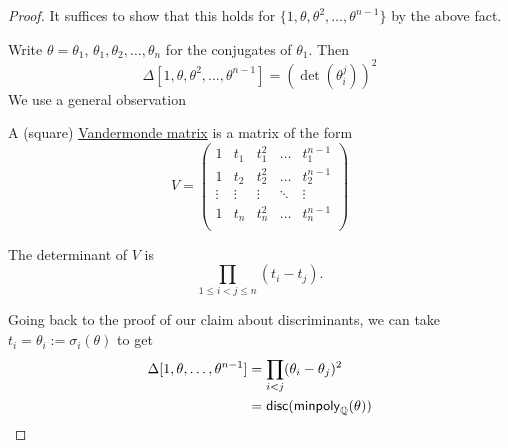 \begin{proof}
    It suffices to show that this holds for $\{1, \theta, \theta^2, \dots, \theta^{n-1}\}$ by the above fact.

    Write $\theta = \theta_1$, $\theta_1, \theta_2, \dots, \theta_n$ for the conjugates of $\theta_1$. Then
    \[\Delta[1, \theta, \theta^2, \dots, \theta^{n-1}] = \left(\det(\theta_i^j)\right)^2\]
    We use a general observation
    \begin{definition}
        A (square) \ul{Vandermonde matrix} is a matrix of the form
        \[V = \begin{pmatrix}
                1      & t_1    & t_1^2  & \dots  & t_1^{n-1} \\
                1      & t_2    & t_2^2  & \dots  & t_2^{n-1} \\
                \vdots & \vdots & \vdots & \ddots & \vdots    \\
                1      & t_n    & t_n^2  & \dots  & t_n^{n-1} \\
            \end{pmatrix}\]
    \end{definition}
    \begin{claim}
        The determinant of $V$ is
        \[\prod_{1\leq i < j\leq n}(t_i - t_j).\]
    \end{claim}
    Going back to the proof of our claim about discriminants, we can take $t_i = \theta_i := \sigma_i(\theta)$ to get
    \begin{align*}
        \Delta[1, \theta, \dots, \theta^{n-1}] & = \prod_{i<j}(\theta_i - \theta_j)^2  \\
                                               & = \mathsf{disc}(\operatorname{\mathsf{minpoly}}_\mathbb Q(\theta))
    \end{align*}
\end{proof}